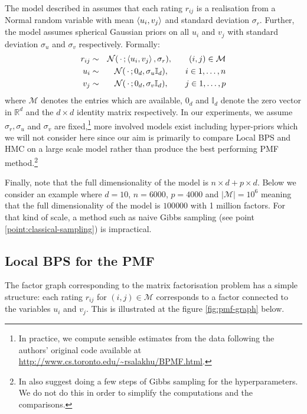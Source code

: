 The model described in \citep{mnih08} assumes that each rating $r_{ij}$ is a realisation from a Normal random variable with mean $\left\langle u_{i}, v_{j} \right\rangle$ and standard deviation $\sigma_{r}$. 
Further, the model assumes spherical Gaussian priors on all $u_{i}$ and $v_{j}$ with standard deviation $\sigma_{u}$ and $\sigma_{v}$ respectively. Formally:
%
\begin{eqnarray}
	r_{ij} &\sim& \mathcal N(\,\cdot\, ; \left\langle u_{i}, v_{j} \right\rangle, \sigma_{r}), \qquad (i,j)\in\mathcal M\nonumber\\
	u_{i} &\sim& \mathcal N(\,\cdot\, ; 0_{d}, \sigma_{u}\mathbb I_{d}), \qquad i\in 1,\dots,n \label{eq:pmf-model}\\
	v_{j} &\sim& \mathcal N(\,\cdot\, ; 0_{d}, \sigma_{v}\mathbb I_{d}), \qquad j\in 1,\dots,p\nonumber
\end{eqnarray}
%
where $\mathcal M$ denotes the entries which are available, $0_{d}$ and $\mathbb I_{d}$ denote the zero vector in $\mathbb R^{d}$ and the $d\times d$ identity matrix respectively. In our experiments, we assume $\sigma_{r}, \sigma_{u}$ and $\sigma_{v}$ are fixed,\footnote{In practice, we compute sensible estimates from the data following the authors' original code available at \url{http://www.cs.toronto.edu/~rsalakhu/BPMF.html}.} more involved models exist including hyper-priors which we will not consider here since our aim is primarily to compare Local BPS and HMC on a large scale model rather than produce the best performing PMF method.\footnote{In \citep{mnih08} also suggest doing a few steps of Gibbs sampling for the hyperparameters. We do not do this in order to simplify the computations and the comparisons.}

Finally, note that the full dimensionality of the model is $n\times d + p\times d$. Below we consider an example where $d=10$, $n=6000$, $p=4000$ and $|\mathcal M|=10^{6}$ meaning that the full dimensionality of the model is $100 000$ with 1 million factors. For that kind of scale, a method such as naive Gibbs sampling (see point \ref{point:classical-sampling}) is impractical. 


\subsection{Local BPS for the PMF}

The factor graph corresponding to the matrix factorisation problem has a simple structure: each rating $r_{ij}$ for $(i,j)\in\mathcal M$ corresponds to a factor connected to the variables $u_{i}$ and $v_{j}$. This is illustrated at the figure \ref{fig:pmf-graph} below.

